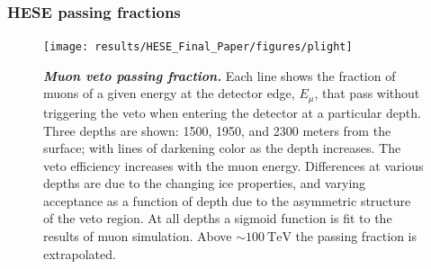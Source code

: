 \subsubsection{HESE passing fractions}

\begin{figure}
	\centering
	\texttt{[image: results/HESE\_Final\_Paper/figures/plight]}
	\internallinenumbers
	\caption{\textbf{\textit{Muon veto passing fraction.}} Each line shows the fraction of muons of a given energy at the detector edge, $E_\mu$, that pass without triggering the veto when entering the detector at a particular depth.
		Three depths are shown: 1500, 1950, and 2300 meters from the surface; with lines of darkening color as the depth increases.
		The veto efficiency increases with the muon energy.
		Differences at various depths are due to the changing ice properties, and varying acceptance as a function of depth due to the asymmetric structure of the veto region.
		At all depths a sigmoid function is fit to the results of muon simulation.
		Above $\sim\SI{100}\TeV$ the passing fraction is extrapolated.}\label{fig:P_light}
\end{figure}


